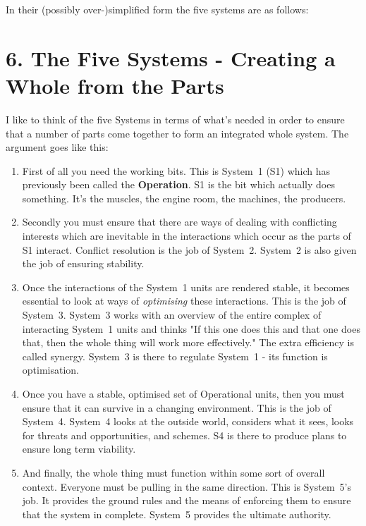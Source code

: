 In their (possibly over-)simplified form the five systems are as follows:


\section*{6. The Five Systems - Creating a Whole from the Parts}
I like to think of the five Systems in terms of what's needed in order to ensure that a number of parts come together to form an integrated whole system. The argument goes like this:

\begin{enumerate}
  \item First of all you need the working bits. This is System 1 (S1) which has previously been called the \textcolor{O}{\textbf{Operation}}. S1 is the bit which actually does something. It's the muscles, the engine room, the machines, the producers.

  \item Secondly you must ensure that there are ways of dealing with conflicting interests which are inevitable in the interactions which occur as the parts of S1 interact. Conflict resolution is the job of System 2. System 2 is also given the job of ensuring stability.

  \item Once the interactions of the System 1 units are rendered stable, it becomes essential to look at ways of \textit{optimising} these interactions. This is the job of System 3. System 3 works with an overview of the entire complex of interacting System 1 units and thinks "If this one does this and that one does that, then the whole thing will work more effectively." The extra efficiency is called synergy. System 3 is there to regulate System 1 - its function is optimisation.

  \item Once you have a stable, optimised set of Operational units, then you must ensure that it can survive in a changing environment. This is the job of System 4. System 4 looks at the outside world, considers what it sees, looks for threats and opportunities, and schemes. S4 is there to produce plans to ensure long term viability.

  \item And finally, the whole thing must function within some sort of overall context. Everyone must be pulling in the same direction. This is System 5's job. It provides the ground rules and the means of enforcing them to ensure that the system in complete. System 5 provides the ultimate authority.

\end{enumerate}

